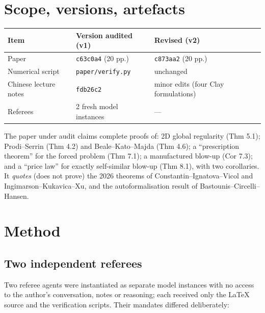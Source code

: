 \documentclass[11pt,a4paper]{article}
\begin{document}
\tableofcontents

\section{Scope, versions, artefacts}

\begin{center}
\begin{tabular}{@{}lll@{}}
\toprule
Item & Version audited (v1) & Revised (v2)\\
\midrule
Paper & \texttt{c63c0a4} (20 pp.) & \texttt{c873aa2} (20 pp.)\\
Numerical script & \texttt{paper/verify.py} & unchanged\\
Chinese lecture notes & \texttt{fdb26c2} & minor edits (four Clay formulations)\\
Referees & 2 fresh model instances & ---\\
\bottomrule
\end{tabular}
\end{center}

The paper under audit claims complete proofs of: 2D global regularity (Thm 5.1);
Prodi--Serrin (Thm 4.2) and Beale--Kato--Majda (Thm 4.6); a ``prescription theorem'' for the
forced problem (Thm 7.1); a manufactured blow-up (Cor 7.3); and a ``price law'' for exactly
self-similar blow-up (Thm 8.1), with two corollaries. It \emph{quotes} (does not prove) the
2026 theorems of Constantin--Ignatova--Vicol and Ingimarson--Kukavica--Xu, and the
autoformalisation result of Bastounis--Circelli--Hansen.

\section{Method}

\subsection{Two independent referees}

Two referee agents were instantiated as separate model instances with no access to the author's
conversation, notes or reasoning; each received only the \LaTeX{} source and the verification
scripts. Their mandates differed deliberately:
\end{document}
